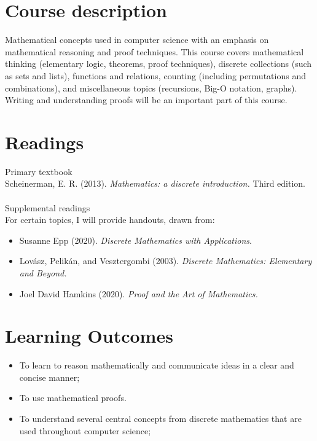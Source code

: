 \documentclass[letterpaper]{inzane_syllabus} %
\begin{document}
\makeprofile %


\section{Course description}

Mathematical concepts used in computer science with an emphasis on mathematical reasoning and proof techniques. This course covers mathematical thinking (elementary logic, theorems, proof techniques), discrete collections (such as sets and lists),  functions and relations,  counting (including permutations and combinations), and miscellaneous topics (recursions, Big-O notation, graphs).  Writing and understanding proofs will be an important part of this course.

\vspace{0.2cm} 
\section{Readings}

{\color{myCOLOR} Primary textbook}\\
Scheinerman, E. R. (2013). \textit{Mathematics: a discrete introduction.} Third edition.\\
\\
{\color{myCOLOR} Supplemental readings}\\ For certain topics, I will provide handouts, drawn from: 
\begin{itemize}
\item Susanne Epp (2020).  \textit{Discrete Mathematics with Applications}.
\item Lov\'asz, Pelik\'an, and Vesztergombi (2003).  \textit{Discrete Mathematics: Elementary and Beyond.} 
\item Joel David Hamkins (2020). \textit{Proof and the Art of Mathematics.}	
\end{itemize}

\vspace{0.2cm}
\section{Learning Outcomes}

\begin{itemize}
\item To learn to reason mathematically and communicate ideas in a clear and concise manner;
\item To use  mathematical proofs.
\item To understand several central concepts from discrete mathematics that are used throughout computer science;
\end{itemize}
\end{document}
